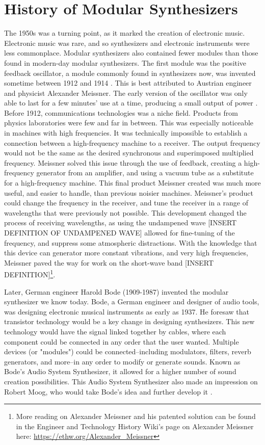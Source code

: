 \section[Modular Synthesizers]{History of Modular Synthesizers}\label{mod-synth-history}

The 1950s was a turning point, as it marked the creation of electronic music. Electronic music was rare, and so synthesizers and electronic instruments were less commonplace. Modular synthesizers also contained fewer modules than those found in modern-day modular synthesizers. The first module was the positive feedback oscillator, a module commonly found in synthesizers now, was invented sometime between 1912 and 1914 \cite{Gabrielli_2020}. This is best attributed to Austrian engineer and physicist Alexander Meissner. The early version of the oscillator was only able to last for a few minutes' use at a time, producing a small output of power \cite{Fleming_1919}. Before 1912, communications technologies was a niche field. Products from physics laboratories were few and far in between. This was especially noticeable in machines with high frequencies. It was technically impossible to establish a connection between a high-frequency machine to a receiver. The output frequency would not be the same as the desired synchronous and superimposed multiplied frequency. Meissner solved this issue through the use of feedback, creating a high-frequency generator from an amplifier, and using a vacuum tube as a substitute for a high-frequency machine. This final product Meissner created was much more useful, and easier to handle, than previous noisier machines. Meissner's product could change the frequency in the receiver, and tune the receiver in a range of wavelengths that were previously not possible. This development changed the process of receiving wavelengths, as using the undampened wave [INSERT DEFINITION OF UNDAMPENED WAVE] allowed for fine-tuning of the frequency, and suppress some atmospheric distractions. With the knowledge that this device can generator more constant vibrations, and very high frequencies, Meissner paved the way for work on the short-wave band [INSERT DEFINITION]\footnote{More reading on Alexander Meissner and his patented solution can be found in the Engineer and Technology History Wiki's page on Alexander Meissner here: \url{https://ethw.org/Alexander_Meissner}}.

Later, German engineer Harold Bode (1909-1987) invented the modular synthesizer we know today. Bode, a German engineer and designer of audio tools, was designing electronic musical instruments as early as 1937. He foresaw that transistor technology would be a key change in designing synthesizers. This new technology would have the signal linked together by cables, where each component could be connected in any order that the user wanted. Multiple devices (or "modules") could be connected--including modulators, filters, reverb generators, and more--in any order to modify or generate sounds. Known as Bode's Audio System Synthesizer, it allowed for a higher number of sound creation possibilities. This Audio System Synthesizer also made an impression on Robert Moog, who would take Bode's idea and further develop it \cite{Gabrielli_2020}. 


